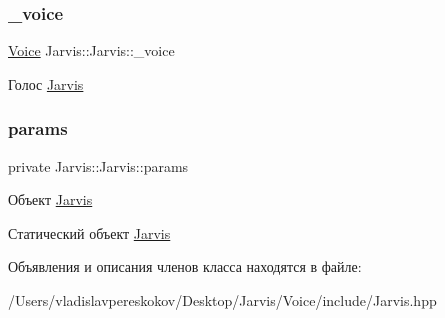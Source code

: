 \subsubsection{\texorpdfstring{\+\_\+voice}{\_voice}}
{\footnotesize\ttfamily \hyperlink{classJarvis_1_1Voice}{Voice} Jarvis\+::\+Jarvis\+::\+\_\+voice}

Голос \hyperlink{classJarvis_1_1Jarvis}{Jarvis} \mbox{\label{classJarvis_1_1Jarvis_a4009b6177d6dd3b01d550ba8d628b0ed}} 
\subsubsection{\texorpdfstring{params}{params}}
{\footnotesize\ttfamily private Jarvis\+::\+Jarvis\+::params}

Объект \hyperlink{classJarvis_1_1Jarvis}{Jarvis}

Статический объект \hyperlink{classJarvis_1_1Jarvis}{Jarvis} 

Объявления и описания членов класса находятся в файле\+:\begin{DoxyCompactItemize}
\item 
/\+Users/vladislavpereskokov/\+Desktop/\+Jarvis/\+Voice/include/Jarvis.\+hpp\end{DoxyCompactItemize}
